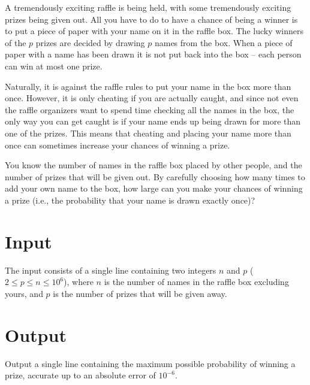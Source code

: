 
%
\noindent
A tremendously exciting raffle is being held, with some tremendously
exciting prizes being given out.  All you have to do to have a chance
of being a winner is to put a piece of paper with your name on it in
the raffle box.  The lucky winners of the $p$ prizes are decided by
drawing $p$ names from the box.  When a piece of paper with a name has
been drawn it is not put back into the box -- each person can win at
most one prize.

Naturally, it is against the raffle rules to put your name in the box
more than once.  However, it is only cheating if you are actually
caught, and since not even the raffle organizers want to spend time
checking all the names in the box, the only way you can get caught is
if your name ends up being drawn for more than one of the prizes.
This means that cheating and placing your name more than once can
sometimes increase your chances of winning a prize.

You know the number of names in the raffle box placed by other people,
and the number of prizes that will be given out.  By carefully
choosing how many times to add your own name to the box, how large can you
make your chances of winning a prize (i.e., the probability that your
name is drawn exactly once)?

\section*{Input}

The input consists of a single line containing two integers $n$ and
$p$ ($2 \le p \le n \le 10^6$), where $n$ is the number of names in
the raffle box excluding yours, and $p$ is the number of prizes that
will be given away.

\section*{Output}

Output a single line containing the maximum possible probability of
winning a prize, accurate up to an absolute error of $10^{-6}$.

